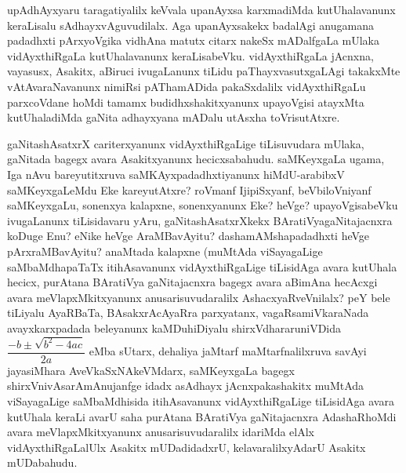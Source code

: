 upAdhAyxyaru taragatiyalilx keVvala upanAyxsa karxmadiMda kutUhalavanunx keraLi\-salu sAdhayxvAguvudilalx. Aga upanAyxsakekx badalAgi anugamana padadhxti pArxyoVgika vidhAna matutx citarx nakeSx mADalfgaLa mUlaka vidAyxthiRgaLa kutUhalavanunx keraLisabeVku. vidAyxthiRgaLa jAcnxna, vayasusx, Asakitx, aBiruci ivugaLanunx tiLidu paThayxvasutxgaLAgi takakxMte vAtAvaraNavanunx nimiRsi pAThamADida pakaSxdalilx vidAyxthiRgaLu parxcoVdane hoMdi tamamx budidhxshakitxyanunx upayoVgisi atayxMta kutUhaladiMda gaNita adhayxyana mADalu utAsxha toVrisutAtxre.

gaNitashAsatxrX cariterxyanunx vidAyxthiRgaLige tiLisuvudara mUlaka, gaNitada bagegx avara Asakitxyanunx hecicxsabahudu. saMKeyxgaLa ugama, Iga nAvu bareyutitxruva saMKAyx\-padadhxtiyanunx hiMdU-arabibxV saMKeyxgaLeMdu Eke kareyutAtxre? roVmanf IjipiSx\-yanf, beVbiloVniyanf saMKeyxgaLu, sonenxya kalapxne, sonenxyanunx Eke? heVge? upayoVgisabeVku ivugaLanunx tiLisidavaru yAru, gaNitashAsatxrXkekx BAratiVya\break gaNitajacnxra koDuge Enu? eNike heVge AraMBavAyitu? dashamAMshapadadhxti heVge pArxraMBavAyitu? anaMtada kalapxne (muMtAda viSayagaLige saMbaMdhapaTaTx itihAsa\-vanunx vidAyxthiR\-gaLige tiLisidAga avara kutUhala hecicx, purAtana BAratiVya \-gaNitajacnxra bagegx avara aBimAna hecAcxgi avara meVlapxMkitxyanunx anusarisuvudaralilx AshacxyaR\-veVnilalx? peY bele tiLiyalu AyaRBaTa, BAsakxrAcAyaRra parxyatanx, vagaRsamiVka\-raNada avayxkarxpadada beleyanunx kaMDuhiDiyalu shirxVdhararuniVDida $\dfrac{-b \pm \sqrt{b^2-4ac}}{2a}$ eMba sUtarx, dehaliya jaMtarf maMtarfnalilxruva savAyi jayasiMhara AveVkaSxNA\-keVMdarx, saMKeyxgaLa bagegx shirxVnivAsarAmAnujanfge idadx asAdhayx jAcnxpakashakitx muMtAda viSayagaLige saMbaMdhisida itihAsavanunx vidAyxthiRgaLige tiLisidAga avara kutUhala keraLi avarU saha purAtana BAratiVya gaNitajacnxra AdashaRhoMdi avara meVlapxMkitx\-yanunx anusarisuvudaralilx idariMda elAlx vidAyxthiRgaLalUlx Asakitx mUDadidadxrU, kelavaralilx\-yAdarU Asakitx mUDabahudu.


